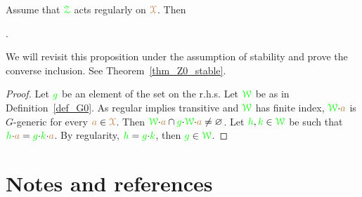 


\begin{proposition}\label{prop_Z0_inclusione}
  Assume that ${\color{green}\EuScript Z}$ acts regularly on ${\color{brown}\EuScript X}$.
  Then
  

  .
 
\end{proposition}


We will revisit this proposition under the assumption of stability and prove the converse inclusion.
See Theorem~\ref{thm_Z0_stable}.\vspace*{-0.5\baselineskip}

\begin{proof}
  Let ${\color{green} g}$ be an element of the set on the r.h.s.
  Let ${\color{green}\EuScript W}$ be as in Definition~\ref{def_G0}.
  As regular implies transitive and ${\color{green}\EuScript W}$ has finite index, ${\color{green}\EuScript W}{\cdot}{\color{brown} a}$ is $G$-generic for every ${\color{brown} a}\in{\color{brown}\EuScript X}$.
  Then ${\color{green}\EuScript W}{\cdot}{\color{brown} a}\cap{\color{green}g}{\cdot}{\color{green}\EuScript W}{\cdot}{\color{brown}a}\neq\varnothing$.
  Let ${\color{green} h},{\color{green} k}\in{\color{green}\EuScript W}$ be such that ${\color{green} h}{\cdot}{\color{brown} a}={\color{green} g}{\cdot}{\color{green} k}{\cdot}{\color{brown} a}$.
  By regularity, ${\color{green} h}={\color{green} g}{\cdot}{\color{green} k}$, then ${\color{green} g}\in{\color{green}\EuScript W}$.
 \end{proof}

\section{Notes and references}

